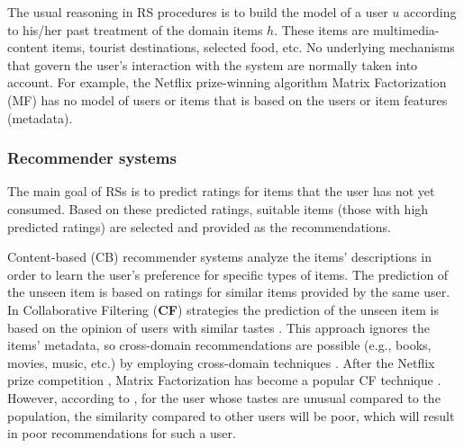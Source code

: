 \documentclass{llncs}
\begin{document}
The usual reasoning in RS procedures is to build the model of a user $u$ according to his/her past treatment of the domain items $h$. These items are multimedia-content items, tourist destinations, selected food, etc. 
No underlying mechanisms that govern the user’s interaction with the system are normally taken into account. For example, the Netflix prize-winning algorithm Matrix Factorization (MF) has no model of users or items that is based on the users or item features (metadata).


\subsubsection{Recommender systems}\label{SubSubSec_RS}

The main goal of RSs is to predict ratings for items that the user has not yet consumed. Based on these predicted ratings, suitable items (those with high predicted ratings) are selected and provided as the recommendations. 

Content-based (CB) recommender systems  \cite{pazzani2007content} analyze the items’ descriptions in order to learn the user’s preference for specific types of items. The prediction of the unseen item is based on ratings for similar items provided by the same user. %
In Collaborative Filtering (\textbf{CF}) strategies the prediction of the unseen item is based on the opinion of users with similar tastes  \cite{resnick1994grouplens}. This approach ignores the items' metadata, so cross-domain recommendations are possible (e.g., books, movies, music, etc.) by employing cross-domain techniques \cite{fernandez2012cross}. After the Netflix prize competition \cite{bennett2007netflix}, Matrix Factorization has become a popular CF technique \cite{Koren2008factorization}. %
However, according to \cite{balabanovic1997fab}, for the user whose tastes are unusual compared to the population, the similarity compared to other users will be poor, which will result in poor recommendations for such a user. %
\end{document}
